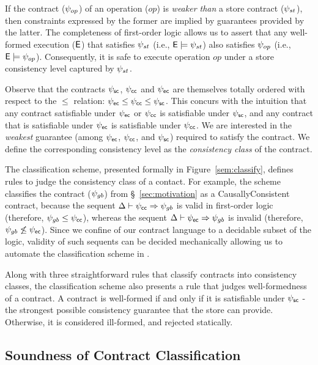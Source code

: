 If the contract ($\psi_{op}$) of an operation ($\mathit{op}$) is \emph{weaker
than} a store contract ($\psi_{st}$), then constraints expressed by the former
are implied by guarantees provided by the latter. The completeness of
first-order logic allows us to assert that any well-formed execution (${\normalfont \textsf{E}}$)
that satisfies $\psi_{st}$ (i.e., ${\normalfont \textsf{E}}\models \psi_{st}$) also satisfies
$\psi_{op}$ (i.e., ${\normalfont \textsf{E}} \models \psi_{op}$). Consequently, it is safe to execute
operation $\mathit{op}$ under a store consistency level captured by $\psi_{st}$.

Observe that the contracts $\psi_{\sf sc}$, $\psi_{\sf cc}$ and $\psi_{\sf ec}$ are themselves totally
ordered with respect to the $\le$ relation: $\psi_{\sf ec} \le \psi_{\sf cc} \le \psi_{\sf sc}$.  This
concurs with the intuition that any contract satisfiable under $\psi_{\sf ec}$ or $\psi_{\sf cc}$
is satisfiable under $\psi_{\sf sc}$, and any contract that is satisfiable under $\psi_{\sf ec}$
is satisfiable under $\psi_{\sf cc}$. We are interested in the \emph{weakest} guarantee
(among $\psi_{\sf ec}$, $\psi_{\sf cc}$, and $\psi_{\sf sc}$) required to satisfy the contract. We define
the corresponding consistency level as the \emph{consistency class} of the
contract.

The classification scheme, presented formally in Figure~\ref{sem:classify},
defines rules to judge the consistency class of a contact. For example, the
scheme classifies the  contract ($\psi_{gb}$) from
\S~\ref{sec:motivation} as a {\sf\small CausallyConsistent} contract, because
the sequent $\Delta \vdash \psi_{\sf cc} \Rightarrow \psi_{gb}$ is valid in first-order
logic (therefore, $\psi_{gb} \le \psi_{\sf cc}$), whereas the sequent $\Delta \vdash \psi_{\sf ec}
\Rightarrow \psi_{gb}$ is invalid (therefore, $\psi_{gb} \not\le \psi_{\sf ec}$). Since we
confine of our contract language to a decidable subset of the logic, validity
of such sequents can be decided mechanically allowing us to automate the
classification scheme in \name.

Along with three straightforward rules that classify contracts into consistency
classes, the classification scheme also presents a rule that judges
well-formedness of a contract. A contract is well-formed if and only if it is
satisfiable under $\psi_{\sf sc}$ - the strongest possible consistency guarantee that
the store can provide. Otherwise, it is considered ill-formed, and rejected
statically.

\subsection{Soundness of Contract Classification}

